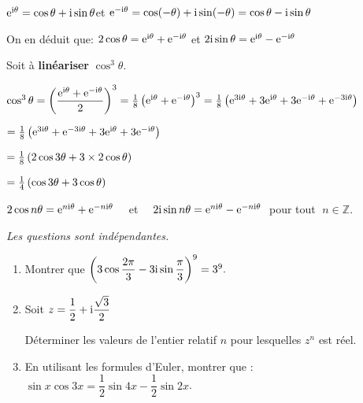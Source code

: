 \medskip

$\mathrm{e}^{\text{i}\theta}=\cos \theta +\text{i}\sin \theta  $\quad  et\quad
 $\mathrm{e}^{-\text{i}\theta}=\cos(-\theta) +\text{i}\sin(- \theta)=\cos \theta -\text{i}\sin \theta $ 


\medskip

On en déduit que: \quad $ 2\cos \theta=\mathrm{e}^{\text{i}\theta}+\mathrm{e}^{-\text{i}\theta} $ \quad  et \quad $ 2\text{i}\sin \theta=\mathrm{e}^{\text{i}\theta}-\mathrm{e}^{-\text{i}\theta} $
\begin{example}
Soit à \textbf{linéariser} $ \cos^3\theta $.
\medskip

$ \cos^3\theta =\left( \dfrac{\mathrm{e}^{\text{i}\theta}+\mathrm{e}^{-\text{i}\theta}}{2}\right)^3=\frac{1}{8}\left(\mathrm{e}^{\text{i}\theta}+\mathrm{e}^{-\text{i}\theta} \right)^3=\frac{1}{8}\left(\mathrm{e}^{3\text{i}\theta}+3\mathrm{e}^{\text{i}\theta}+3\mathrm{e}^{-\text{i}\theta} +\mathrm{e}^{-3\text{i}\theta}\right)$

\medskip

 $ =\frac{1}{8}\left(\mathrm{e}^{3\text{i}\theta}+\mathrm{e}^{-3\text{i}\theta}+3\mathrm{e}^{\text{i}\theta}+3\mathrm{e}^{-\text{i}\theta}\right) $


\medskip

$ =\frac{1}{8}\left(2\cos 3\theta+3\times 2\cos \theta\right) $

 $ =\frac{1}{4}\left(\cos 3\theta+3\cos \theta\right) $
\end{example}

\begin{corollary}
 $ 2\cos n\theta=\mathrm{e}^{n\text{i}\theta}+\mathrm{e}^{-n\text{i}\theta} \quad $  et $\quad  2\text{i}\sin n \theta=\mathrm{e}^{n \text{i}\theta}-\mathrm{e}^{-n \text{i}\theta} \; $  pour tout $ \; n\in\mathbb{Z} $.
\end{corollary}

\begin{exercice}
\textit{Les questions sont indépendantes.}
\begin{enumerate}
\item  Montrer que \; $ \left( 3\cos\dfrac{2\pi}{3} -3\text{i}\sin\dfrac{\pi}{3} \right)^9=3^9. $
\item  Soit $ z=\dfrac{1}{2} +\text{i}\dfrac{\sqrt{3}}{2}$

Déterminer les valeurs de l'entier relatif $ n $ pour lesquelles $ z^n $ est réel.
\item 
En utilisant les formules d'Euler, montrer que : $ \sin x\cos3 x=\dfrac{1}{2} \sin 4x -\dfrac{1}{2} \sin 2x$.
\end{enumerate}
\end{exercice}
